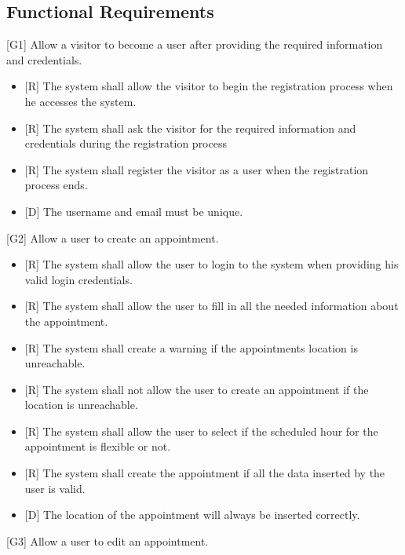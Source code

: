 \documentclass[12pt]{article}
\begin{document}
\subsection{Functional Requirements}

{[G1]} Allow a visitor to become a user after providing the required information and credentials.
\begin{itemize}
    \item{[R]} The system shall allow the visitor to begin the registration process when he accesses the system. 
    \item{[R]} The system shall ask the visitor for the required information and credentials during the registration process
    \item{[R]} The system shall register the visitor as a user when the registration process ends.
    \item {[D]} The username and email must be unique.
\end{itemize}
{[G2]} Allow a user to create an appointment.
\begin{itemize}
    \item{[R]} The system shall allow the user to login to the system when providing his valid login credentials.
    \item{[R]} The system shall allow the user to fill in all the needed information about the appointment.
    \item{[R]} The system shall create a warning if the appointments location is unreachable.
    \item{[R]} The system shall not allow the user to create an appointment if the location is unreachable.
    \item{[R]} The system shall allow the user to select if the scheduled hour for the appointment is flexible or not.
    \item{[R]} The system shall create the appointment if all the data inserted by the user is valid.
    \item {[D]} The location of the appointment will always be inserted correctly.
\end{itemize}
{[G3]} Allow a user to edit an appointment.
\end{document}
